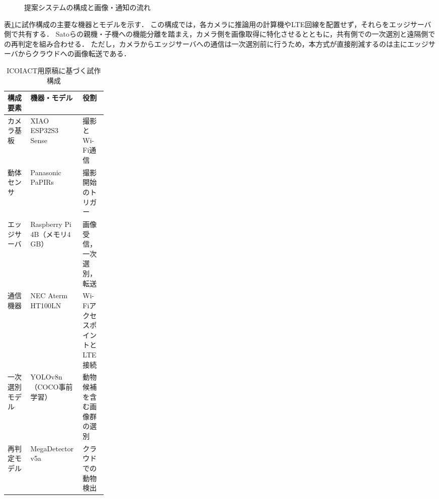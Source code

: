 \begin{figure}[tp]
  \centering
  \caption{提案システムの構成と画像・通知の流れ}
  \label{fig:system-overview}
\end{figure}

表\ref{tab:system-components}に試作構成の主要な機器とモデルを示す．
この構成では，各カメラに推論用の計算機やLTE回線を配置せず，それらをエッジサーバ側で共有する．
Satoら\cite{Sato2022}の親機・子機への機能分離を踏まえ，カメラ側を画像取得に特化させるとともに，共有側での一次選別と遠隔側での再判定を組み合わせる．
ただし，カメラからエッジサーバへの通信は一次選別前に行うため，本方式が直接削減するのは主にエッジサーバからクラウドへの画像転送である．

\begin{table}[tp]
  \centering
  \small
  \caption{ICOIACT用原稿に基づく試作構成}
  \label{tab:system-components}
  \begin{tabularx}{\linewidth}{p{0.23\linewidth}XX}
    \toprule
    構成要素 & 機器・モデル & 役割 \\
    \midrule
    カメラ基板 & XIAO ESP32S3 Sense & 撮影とWi-Fi通信 \\
    動体センサ & Panasonic PaPIRs & 撮影開始のトリガー \\
    エッジサーバ & Raspberry Pi 4B（メモリ4\,GB） & 画像受信，一次選別，転送 \\
    通信機器 & NEC Aterm HT100LN & Wi-FiアクセスポイントとLTE接続 \\
    一次選別モデル & YOLOv8n（COCO事前学習） & 動物候補を含む画像群の選別 \\
    再判定モデル & MegaDetector v5a & クラウドでの動物検出 \\
    \bottomrule
  \end{tabularx}
\end{table}


